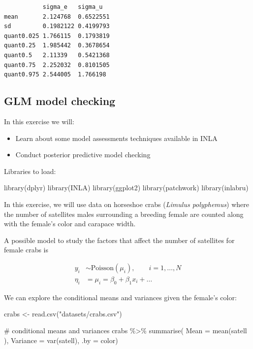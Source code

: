 \documentclass[
  letterpaper,
  DIV=11,
  numbers=noendperiod]{scrartcl}
\newenvironment{Shaded}{\begin{snugshade}}{\end{snugshade}}
\newcommand{\AttributeTok}[1]{\textcolor[rgb]{0.40,0.45,0.13}{#1}}
\newcommand{\CommentTok}[1]{\textcolor[rgb]{0.37,0.37,0.37}{#1}}
\newcommand{\FunctionTok}[1]{\textcolor[rgb]{0.28,0.35,0.67}{#1}}
\newcommand{\NormalTok}[1]{\textcolor[rgb]{0.00,0.23,0.31}{#1}}
\newcommand{\OtherTok}[1]{\textcolor[rgb]{0.00,0.23,0.31}{#1}}
\newcommand{\SpecialCharTok}[1]{\textcolor[rgb]{0.37,0.37,0.37}{#1}}
\newcommand{\StringTok}[1]{\textcolor[rgb]{0.13,0.47,0.30}{#1}}
\providecommand{\tightlist}{%
  \setlength{\itemsep}{0pt}\setlength{\parskip}{0pt}}\usepackage{longtable,booktabs,array}
\begin{document}
\begin{tcolorbox}
\begin{verbatim}
           sigma_e   sigma_u  
mean       2.124768  0.6522551
sd         0.1982122 0.4199793
quant0.025 1.766115  0.1793819
quant0.25  1.985442  0.3678654
quant0.5   2.11339   0.5421368
quant0.75  2.252032  0.8101505
quant0.975 2.544005  1.766198 
\end{verbatim}

\end{tcolorbox}

\subsection{GLM model checking}\label{sec-linmodel}

In this exercise we will:

\begin{itemize}
\tightlist
\item
  Learn about some model assessments techniques available in INLA
\item
  Conduct posterior predictive model checking
\end{itemize}

Libraries to load:

\begin{Shaded}
\begin{Highlighting}[]
\FunctionTok{library}\NormalTok{(dplyr)}
\FunctionTok{library}\NormalTok{(INLA)}
\FunctionTok{library}\NormalTok{(ggplot2)}
\FunctionTok{library}\NormalTok{(patchwork)}
\FunctionTok{library}\NormalTok{(inlabru)     }
\end{Highlighting}
\end{Shaded}

In this exercise, we will use data on horseshoe crabs (\emph{Limulus
polyphemus}) where the number of satellites males surrounding a breeding
female are counted along with the female's color and carapace width.

A possible model to study the factors that affect the number of
satellites for female crabs is

\[
\begin{aligned}
y_i&\sim\mathrm{Poisson}(\mu_i), \qquad i = 1,\dots,N \\
\eta_i &= \mu_i = \beta_0 + \beta_1 x_i + \ldots
\end{aligned}
\]

We can explore the conditional means and variances given the female's
color:

\begin{Shaded}
\begin{Highlighting}[]
\NormalTok{crabs }\OtherTok{\textless{}{-}} \FunctionTok{read.csv}\NormalTok{(}\StringTok{"datasets/crabs.csv"}\NormalTok{)}

\CommentTok{\# conditional means and variances}
\NormalTok{crabs }\SpecialCharTok{\%\textgreater{}\%}
  \FunctionTok{summarise}\NormalTok{( }\AttributeTok{Mean =} \FunctionTok{mean}\NormalTok{(satell ),}
             \AttributeTok{Variance =} \FunctionTok{var}\NormalTok{(satell),}
                     \AttributeTok{.by =}\NormalTok{ color)}
\end{Highlighting}
\end{Shaded}
\end{document}
